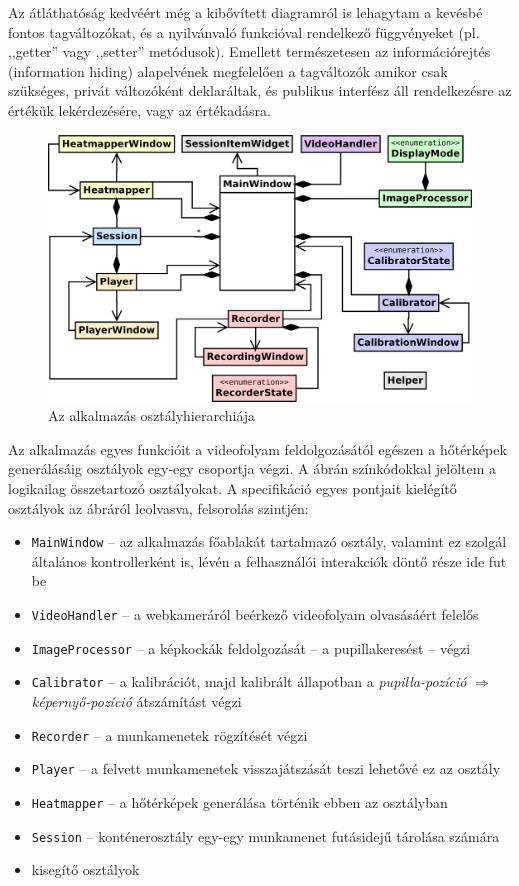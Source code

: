   Az átláthatóság kedvéért még a kibővített diagramról is lehagytam a kevésbé fontos tagváltozókat, és a nyilvánvaló funkcióval rendelkező függvényeket (pl. ,,getter'' vagy ,,setter'' metódusok). Emellett természetesen az információrejtés (information hiding) alapelvének megfelelően a tagváltozók amikor csak szükséges, privát változóként deklaráltak, és publikus interfész áll rendelkezésre az értékük lekérdezésére, vagy az értékadásra.

\begin{figure}[!ht]
\centering
\includegraphics[width=140mm, keepaspectratio]{figures/overview_aa.png}
\caption{Az alkalmazás osztályhierarchiája}
\label{fig:overview}
\end{figure}

Az alkalmazás egyes funkcióit a videofolyam feldolgozásától egészen a hőtérképek generálásáig osztályok egy-egy csoportja végzi. A  ábrán színkódokkal jelöltem a logikailag összetartozó osztályokat. A specifikáció egyes pontjait kielégítő osztályok az ábráról leolvasva, felsorolás szintjén:

\begin{itemize}
  \item \texttt{MainWindow} -- az alkalmazás főablakát tartalmazó osztály, valamint ez szolgál általános kontrollerként is, lévén a felhasználói interakciók döntő része ide fut be
  \item \texttt{VideoHandler} -- a webkameráról beérkező videofolyam olvasásáért felelős
  \item \texttt{ImageProcessor} -- a képkockák feldolgozását -- a pupillakeresést -- végzi
  \item \texttt{Calibrator} -- a kalibrációt, majd kalibrált állapotban a \emph{pupilla-pozíció} $\Longrightarrow$ \emph{képernyő-pozíció} átszámítást végzi
  \item \texttt{Recorder} -- a munkamenetek rögzítését végzi
  \item \texttt{Player} -- a felvett munkamenetek visszajátszását teszi lehetővé ez az osztály
  \item \texttt{Heatmapper} -- a hőtérképek generálása történik ebben az osztályban
  \item \texttt{Session} -- konténerosztály egy-egy munkamenet futásidejű tárolása számára
  \item kisegítő osztályok
\end{itemize}

